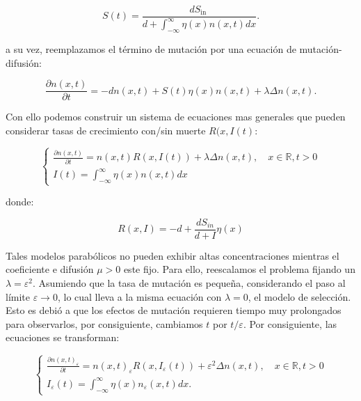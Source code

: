\begin{equation*}
	S(t)=\frac{d S_{\text {in }}}{d+\int_{-\infty}^{\infty} \eta(x) n(x, t) d x} .
\end{equation*}

a su vez, reemplazamos el término de mutación por una ecuación de mutación-difusión:

\begin{equation*}
	\frac{\partial n(x, t)}{\partial t}=-d n(x, t)+S(t) \eta(x) n(x, t)+\lambda \Delta n(x, t) .
\end{equation*}

Con ello podemos construir un sistema de ecuaciones mas generales que pueden considerar tasas de crecimiento con/sin muerte $R(x,I(t)$:

\begin{equation*}
	\left\{\begin{array}{l}
		\frac{\partial n(x, t)}{\partial t}=n(x, t) R(x, I(t))+\lambda \Delta n(x, t), \quad x \in \mathbb{R}, t>0 \\
		I(t)=\int_{-\infty}^{\infty} \eta(x) n(x, t) d x
	\end{array}\right.
\end{equation*}

donde:

\begin{equation*}
	R(x,I)=-d+\frac{dS_{in}}{d+I}\eta(x)
\end{equation*}

\citep{Mirrahimi2011}Tales modelos parabólicos no pueden exhibir altas concentraciones mientras el coeficiente e difusión $\mu>0$ este fijo. Para ello, reescalamos el problema fijando un $\lambda=\varepsilon^2$. Asumiendo que la tasa de mutación es pequeña, considerando el paso al límite $\varepsilon \rightarrow 0$, lo cual lleva a la misma ecuación con $\lambda=0$, el modelo de selección. Esto es debió a que los efectos de mutación requieren tiempo muy prolongados para observarlos, por consiguiente, cambiamos $t$ por $t/\varepsilon$. Por consiguiente, las ecuaciones se transforman:

\begin{equation}
	\left\{\begin{array}{l}
		\frac{\partial n(x, t)_\varepsilon}{\partial t}=n(x, t)_\varepsilon R(x, I_\varepsilon(t))+ \varepsilon^2 \Delta n(x, t), \quad x \in \mathbb{R}, t>0 \\
		I_\varepsilon(t)=\int_{-\infty}^{\infty} \eta(x) n_\varepsilon(x, t) d x .
	\end{array}\right.
\end{equation}

